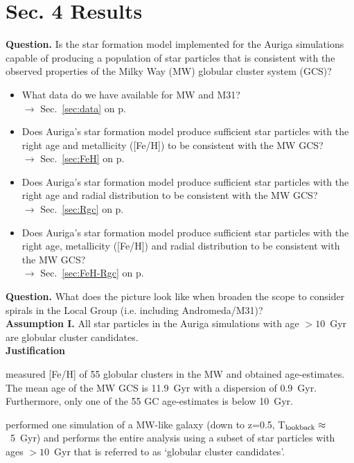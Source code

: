 \documentclass[12pt, a4paper]{article}
\begin{document}
\part*{Sec. 4 \quad Results}
\textbf{Question.} Is the star formation model implemented for the Auriga simulations
capable of producing a population of star particles that is consistent with the
observed properties of the Milky Way (MW) globular cluster system (GCS)?
\begin{itemize}
    \item What data do we have available for MW and M31? \\
        \null\qquad $\rightarrow$ Sec.~\ref{sec:data} on p.~\pageref{sec:data}
    \item Does Auriga's star formation model produce sufficient star particles
        with the right age and metallicity ([Fe/H]) to be consistent with the
        MW GCS? \\
        \null\qquad $\rightarrow$ Sec.~\ref{sec:FeH} on p.~\pageref{sec:FeH}
    \item Does Auriga's star formation model produce sufficient star particles
        with the right age and radial distribution to be consistent with the
        MW GCS? \\
        \null\qquad $\rightarrow$ Sec.~\ref{sec:Rgc} on p.~\pageref{sec:Rgc}
    \item Does Auriga's star formation model produce sufficient star particles
        with the right age, metallicity ([Fe/H]) and radial distribution to be
        consistent with the MW GCS? \\
        \null\qquad $\rightarrow$ Sec.~\ref{sec:FeH-Rgc} on p.~\pageref{sec:FeH-Rgc}
\end{itemize}
\textbf{Question.} What does the picture look like when broaden the scope to
consider spirals in the Local Group (i.e. including Andromeda/M31)? \\

\noindent \textbf{Assumption I.} All star particles in the Auriga simulations with age
$> 10$~Gyr are globular cluster candidates. \\

\textbf{Justification}
\begin{enumerate}[i)]
    {\setlength\itemindent{25pt} \item
        \citet{2013ApJ...775..134V} measured [Fe/H] of 55 globular clusters in
        the MW and obtained age-estimates. The mean age of the MW GCS is 11.9~Gyr
        with a dispersion of 0.9~Gyr. Furthermore, only one of the 55 GC
        age-estimates is below 10~Gyr.
    }
    {\setlength\itemindent{25pt} \item
        \citet{2017MNRAS.465.3622R} performed one simulation of a MW-like galaxy
        (down to z=0.5, T$_{\rm lookback}\approx$~5~Gyr) and performs the entire
        analysis using a subset of star particles with ages $>10$~Gyr that is
        referred to as `globular cluster candidates'.
    }
\end{enumerate}
\end{document}
